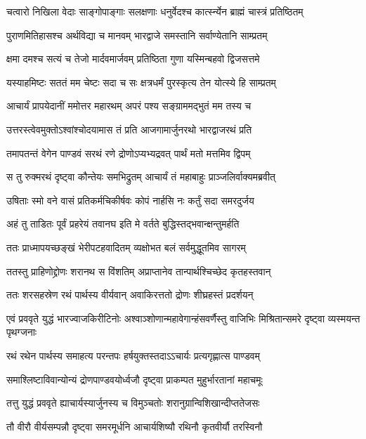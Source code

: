 \twolineshloka
{चत्वारो निखिला वेदाः साङ्गोपाङ्गाः सलक्षणाः}
{धनुर्वेदश्च कार्त्स्न्येन ब्राह्मं चास्त्रं प्रतिष्ठितम्}


\twolineshloka
{पुराणमितिहासश्च अर्थविद्या च मानवम्}
{भारद्वाजे समस्तानि सर्वाण्येतानि साम्प्रतम्}


\twolineshloka
{क्षमा दमश्च सत्यं च तेजो मार्दवमार्जवम्}
{प्रतिष्ठिता गुणा यस्मिन्बहवो द्विजसत्तमे}


\twolineshloka
{यस्याहमिष्टः सततं मम चेष्टः सदा च सः}
{क्षत्रधर्मं पुरस्कृत्य तेन योत्स्ये हि साम्प्रतम्}


\twolineshloka
{आचार्यं प्रापयेदानीं ममोत्तर महारथम्}
{अपरं पश्य सङ्ग्राममद्भुतं मम तस्य च}


\twolineshloka
{उत्तरस्त्वेवमुक्तोऽश्वांश्चोदयामास तं प्रति}
{आजगामार्जुनरथो भारद्वाजरथं प्रति}


\twolineshloka
{तमापतन्तं वेगेन पाण्डवं सरथं रणे}
{द्रोणोऽप्यभ्यद्रवत् पार्थं मतो मत्तमिव द्विपम्}


\twolineshloka
{स तु रुक्मरथं दृष्ट्वा कौन्तेयः समभिद्रुतम्}
{आचार्यं तं महाबाहुः प्राञ्जलिर्वाक्यमब्रवीत्}


\twolineshloka
{उषिताः स्मो वने वासं प्रतिकर्मचिकीर्षवः}
{कोपं नार्हसि नः कर्तुं सदा समरदुर्जय}


\twolineshloka
{अहं तु ताडितः पूर्वं प्रहरेयं तवानघ}
{इति मे वर्तते बुद्धिस्तद्भवान्क्षन्तुमर्हति}


\twolineshloka
{ततः प्राध्मापयच्छङ्खं भेरीपटहवादितम्}
{व्यक्षोभत बलं सर्वमुद्धूतमिव सागरम्}



\twolineshloka
{ततस्तु प्राहिणोद्द्रोणः शरानथ स विंशतिम्}
{अप्राप्तानेव तान्पार्थश्चिच्छेद कृतहस्तवान्}


\twolineshloka
{ततः शरसहस्रेण रथं पार्थस्य वीर्यवान्}
{अवाकिरत्ततो द्रोणः शीघ्रहस्तं प्रदर्शयन्}


\onelineshloka
{एवं प्रववृते युद्धं भारज्वाजकिरीटिनोः}
\twolineshloka
{अश्वाञ्शोणान्महावेगान्हंसवर्णैस्तु वाजिभिः}
{मिश्रितान्समरे दृष्ट्वा व्यस्मयन्त पृथग्जनाः}


\twolineshloka
{रथं रथेन पार्थस्य समाहत्य परन्तपः}
{हर्षयुक्तस्तदाऽऽचार्यः प्रत्यगृह्णात्स पाण्डवम्}


\twolineshloka
{समाश्लिष्टाविवान्योन्यं द्रोणपाण्डवयोर्ध्वजौ}
{दृष्ट्वा प्राकम्पत मुहुर्भारतानां महाचमूः}


\twolineshloka
{तत्तु युद्धं प्रववृते ह्याचार्यस्यार्जुनस्य च}
{विमुञ्चतोः शरानुग्रान्विशिखान्दीप्ततेजसः}


\twolineshloka
{तौ वीरौ वीर्यसम्पन्नौ दृष्ट्वा समरमूर्धनि}
{आचार्यशिष्यौ रथिनौ कृतवीर्यौ तरस्विनौ}


